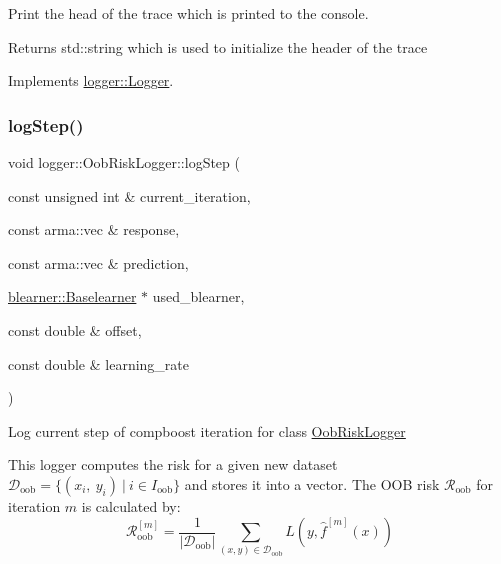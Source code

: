 Print the head of the trace which is printed to the console. 

\begin{DoxyReturn}{Returns}
{\ttfamily std\+::string} which is used to initialize the header of the trace 
\end{DoxyReturn}


Implements \mbox{\hyperlink{classlogger_1_1_logger_a825f96e8564ac4013ff09ef842c0aeec}{logger\+::\+Logger}}.

\mbox{\label{classlogger_1_1_oob_risk_logger_a948a89f02ac782c25a15c49c4a108c02}} 
\subsubsection{\texorpdfstring{log\+Step()}{logStep()}}
{\footnotesize\ttfamily void logger\+::\+Oob\+Risk\+Logger\+::log\+Step (\begin{DoxyParamCaption}\item[{const unsigned int \&}]{current\+\_\+iteration,  }\item[{const arma\+::vec \&}]{response,  }\item[{const arma\+::vec \&}]{prediction,  }\item[{\mbox{\hyperlink{classblearner_1_1_baselearner}{blearner\+::\+Baselearner}} $\ast$}]{used\+\_\+blearner,  }\item[{const double \&}]{offset,  }\item[{const double \&}]{learning\+\_\+rate }\end{DoxyParamCaption})\hspace{0.3cm}{\ttfamily [virtual]}}



Log current step of compboost iteration for class {\ttfamily \mbox{\hyperlink{classlogger_1_1_oob_risk_logger}{Oob\+Risk\+Logger}}} 

This logger computes the risk for a given new dataset $\mathcal{D}_\mathrm{oob} = \{(x_i,\ y_i)\ |\ i \in I_\mathrm{oob}\}$ and stores it into a vector. The O\+OB risk $\mathcal{R}_\mathrm{oob}$ for iteration $m$ is calculated by\+: \[ \mathcal{R}_\mathrm{oob}^{[m]} = \frac{1}{|\mathcal{D}_\mathrm{oob}|}\sum\limits_{(x,y) \in \mathcal{D}_\mathrm{oob}} L(y, \hat{f}^{[m]}(x)) \]

